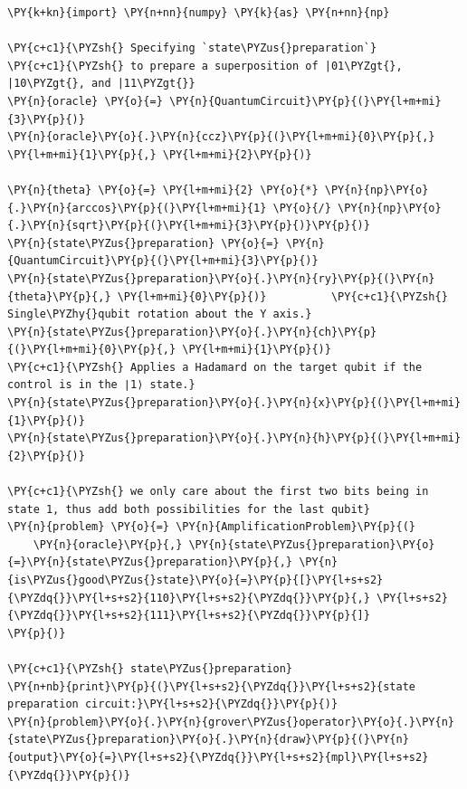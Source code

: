     \begin{tcolorbox}[breakable, size=fbox, boxrule=1pt, pad at break*=1mm,colback=cellbackground, colframe=cellborder]
\begin{Verbatim}[commandchars=\\\{\}]
\PY{k+kn}{import} \PY{n+nn}{numpy} \PY{k}{as} \PY{n+nn}{np}

\PY{c+c1}{\PYZsh{} Specifying `state\PYZus{}preparation`}
\PY{c+c1}{\PYZsh{} to prepare a superposition of |01\PYZgt{}, |10\PYZgt{}, and |11\PYZgt{}}
\PY{n}{oracle} \PY{o}{=} \PY{n}{QuantumCircuit}\PY{p}{(}\PY{l+m+mi}{3}\PY{p}{)}
\PY{n}{oracle}\PY{o}{.}\PY{n}{ccz}\PY{p}{(}\PY{l+m+mi}{0}\PY{p}{,} \PY{l+m+mi}{1}\PY{p}{,} \PY{l+m+mi}{2}\PY{p}{)}

\PY{n}{theta} \PY{o}{=} \PY{l+m+mi}{2} \PY{o}{*} \PY{n}{np}\PY{o}{.}\PY{n}{arccos}\PY{p}{(}\PY{l+m+mi}{1} \PY{o}{/} \PY{n}{np}\PY{o}{.}\PY{n}{sqrt}\PY{p}{(}\PY{l+m+mi}{3}\PY{p}{)}\PY{p}{)}
\PY{n}{state\PYZus{}preparation} \PY{o}{=} \PY{n}{QuantumCircuit}\PY{p}{(}\PY{l+m+mi}{3}\PY{p}{)}
\PY{n}{state\PYZus{}preparation}\PY{o}{.}\PY{n}{ry}\PY{p}{(}\PY{n}{theta}\PY{p}{,} \PY{l+m+mi}{0}\PY{p}{)}          \PY{c+c1}{\PYZsh{} Single\PYZhy{}qubit rotation about the Y axis.}
\PY{n}{state\PYZus{}preparation}\PY{o}{.}\PY{n}{ch}\PY{p}{(}\PY{l+m+mi}{0}\PY{p}{,} \PY{l+m+mi}{1}\PY{p}{)}              \PY{c+c1}{\PYZsh{} Applies a Hadamard on the target qubit if the control is in the ∣1⟩ state.}
\PY{n}{state\PYZus{}preparation}\PY{o}{.}\PY{n}{x}\PY{p}{(}\PY{l+m+mi}{1}\PY{p}{)}
\PY{n}{state\PYZus{}preparation}\PY{o}{.}\PY{n}{h}\PY{p}{(}\PY{l+m+mi}{2}\PY{p}{)}

\PY{c+c1}{\PYZsh{} we only care about the first two bits being in state 1, thus add both possibilities for the last qubit}
\PY{n}{problem} \PY{o}{=} \PY{n}{AmplificationProblem}\PY{p}{(}
    \PY{n}{oracle}\PY{p}{,} \PY{n}{state\PYZus{}preparation}\PY{o}{=}\PY{n}{state\PYZus{}preparation}\PY{p}{,} \PY{n}{is\PYZus{}good\PYZus{}state}\PY{o}{=}\PY{p}{[}\PY{l+s+s2}{\PYZdq{}}\PY{l+s+s2}{110}\PY{l+s+s2}{\PYZdq{}}\PY{p}{,} \PY{l+s+s2}{\PYZdq{}}\PY{l+s+s2}{111}\PY{l+s+s2}{\PYZdq{}}\PY{p}{]}
\PY{p}{)}

\PY{c+c1}{\PYZsh{} state\PYZus{}preparation}
\PY{n+nb}{print}\PY{p}{(}\PY{l+s+s2}{\PYZdq{}}\PY{l+s+s2}{state preparation circuit:}\PY{l+s+s2}{\PYZdq{}}\PY{p}{)}
\PY{n}{problem}\PY{o}{.}\PY{n}{grover\PYZus{}operator}\PY{o}{.}\PY{n}{state\PYZus{}preparation}\PY{o}{.}\PY{n}{draw}\PY{p}{(}\PY{n}{output}\PY{o}{=}\PY{l+s+s2}{\PYZdq{}}\PY{l+s+s2}{mpl}\PY{l+s+s2}{\PYZdq{}}\PY{p}{)}
\end{Verbatim}
\end{tcolorbox}

